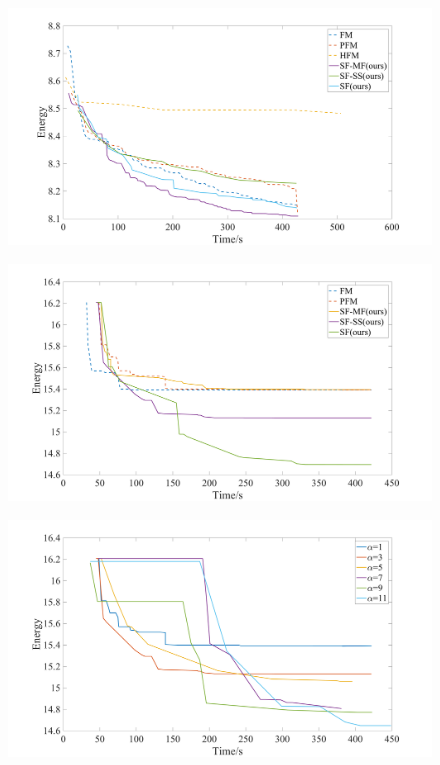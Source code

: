 \begin{figure}[tb]
  \includegraphics[width=\columnwidth]{figure/optical_flow_convergence.png}
  \caption{}\label{fig:optical_flow_convergence}
\end{figure}
\begin{figure}[tb]
 \includegraphics[width=\columnwidth]{figure/layered_depthmap_convergence.png}
 \caption{}\label{fig:layered_depthmap_convergence}
\end{figure}
\begin{figure}[tb]
  \includegraphics[width=\columnwidth]{figure/layered_depthmap_by_alpha.png}
  \caption{}\label{fig:layered_depthmap_by_alpha}
\end{figure}

